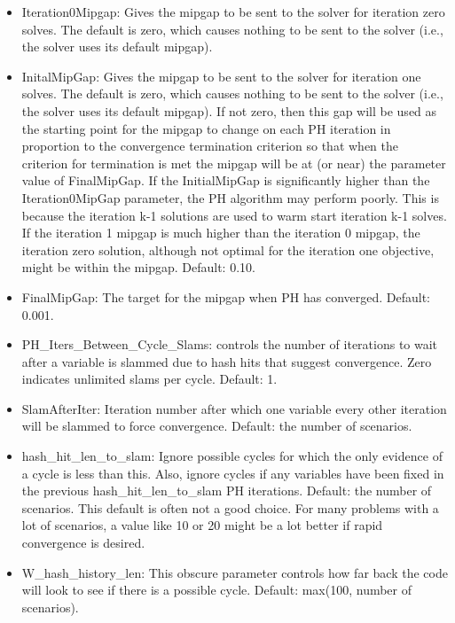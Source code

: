 \begin{itemize}
  \item Iteration0Mipgap: Gives the mipgap to be sent to the solver for
  iteration zero solves. The default is zero, which causes nothing to be sent to
  the solver (i.e., the solver uses its default mipgap).

  \item InitalMipGap: Gives the mipgap to be sent to the solver for iteration
  one solves. The default is zero, which causes nothing to be sent to the solver
  (i.e., the solver uses its default mipgap). If not zero, then this gap will be
  used as the starting point for the mipgap to change on each PH iteration in
  proportion to the convergence termination criterion so that when the criterion
  for termination is met the mipgap will be at (or near) the parameter value of
  FinalMipGap. If the InitialMipGap is significantly higher than the
  Iteration0MipGap parameter, the PH algorithm may perform poorly. This is
  because the iteration k-1 solutions are used to warm start iteration k-1
  solves. If the iteration 1 mipgap is much higher than the iteration 0 mipgap,
  the iteration zero solution, although not optimal for the iteration one
  objective, might be within the mipgap. Default: 0.10.

  \item FinalMipGap: The target for the mipgap when PH has converged. Default:
  0.001.

  \item PH\_Iters\_Between\_Cycle\_Slams: controls the number of iterations to
  wait after a variable is slammed due to hash hits that suggest convergence.
  Zero indicates unlimited slams per cycle. Default: 1.

  \item SlamAfterIter: Iteration number after which one variable every other
  iteration will be slammed to force convergence. Default: the number of
  scenarios.

  \item hash\_hit\_len\_to\_slam: Ignore possible cycles for which the only
  evidence of a cycle is less than this. Also, ignore cycles if any variables
  have been fixed in the previous hash\_hit\_len\_to\_slam PH iterations.
  Default: the number of scenarios. This default is often not a good choice. For
  many problems with a lot of scenarios, a value like 10 or 20 might be a lot
  better if rapid convergence is desired.

  \item W\_hash\_history\_len: This obscure parameter controls how far back the
  code will look to see if there is a possible cycle. Default: max(100, number
  of scenarios).
\end{itemize}

